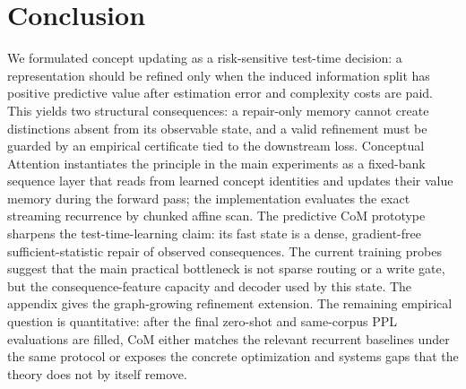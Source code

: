 \section{Conclusion}
\label{sec:main-conclusion}

We formulated concept updating as a risk-sensitive test-time decision: a representation should be refined only when the induced information split has positive predictive value after estimation error and complexity costs are paid. This yields two structural consequences: a repair-only memory cannot create distinctions absent from its observable state, and a valid refinement must be guarded by an empirical certificate tied to the downstream loss. Conceptual Attention instantiates the principle in the main experiments as a fixed-bank sequence layer that reads from learned concept identities and updates their value memory during the forward pass; the implementation evaluates the exact streaming recurrence by chunked affine scan. The predictive CoM prototype sharpens the test-time-learning claim: its fast state is a dense, gradient-free sufficient-statistic repair of observed consequences. The current training probes suggest that the main practical bottleneck is not sparse routing or a write gate, but the consequence-feature capacity and decoder used by this state. The appendix gives the graph-growing refinement extension. The remaining empirical question is quantitative: after the final zero-shot and same-corpus PPL evaluations are filled, CoM either matches the relevant recurrent baselines under the same protocol or exposes the concrete optimization and systems gaps that the theory does not by itself remove.
